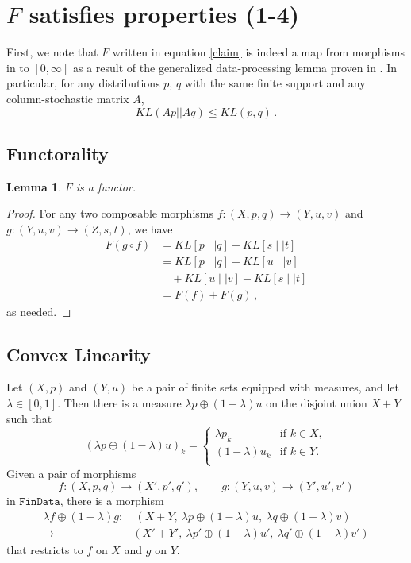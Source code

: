 \documentclass{article}
\newtheorem{lemma}{Lemma}
\begin{document}
\section{$F$ satisfies properties (1-4)}
First, we note that $F$ written in equation \eqref{claim} is indeed a map from morphisms in  to $[0, \infty]$ as a result of the generalized data-processing lemma proven in \cite{cohenRelativeEntropyMappings1993}. In particular, for any distributions $p$, $q$ with the same finite support and any column-stochastic matrix $A$, 
$$
    KL(Ap || Aq) \leq KL(p, q)\,.
$$

\subsection{Functorality}
\begin{lemma}
$F$ is a functor.
\end{lemma}

\begin{proof}
For any two composable morphisms $f:(X, p, q) \rightarrow (Y, u, v)$ and $g:(Y, u, v) \rightarrow (Z, s, t)$, we have 
\begin{align*}
  F(g \circ f) &= KL[p \mid\mid q] - KL[s \mid\mid t]\\
  &= KL[p \mid\mid q] - KL[u \mid\mid v] \\
  &\quad + KL[u \mid\mid v] - KL[s \mid\mid t] \\
  &= F(f) + F(g)\,,
\end{align*}
as needed.
\end{proof}


\subsection{Convex Linearity}
Let $(X, p)$ and $(Y, u)$ be a pair of finite sets equipped with measures, and let $\lambda \in [0,1]$. Then there is a measure $\lambda p \oplus (1-\lambda)u$ on the disjoint union $X + Y$ such that
$$
  (\lambda p \oplus (1-\lambda)u)_k = \begin{cases}
    \lambda p_k &\text{if } k\in X,\\
    (1-\lambda) u_k &\text{if } k\in Y.\\
  \end{cases}
$$
Given a pair of morphisms
$$
f:(X, p, q) \rightarrow (X', p', q'), \qquad g:(Y, u, v) \rightarrow (Y', u', v')
$$
in $\texttt{FinData}$, there is a  morphism
\begin{align*}
\lambda f \oplus (1-\lambda) g:
&\ (X + Y, \ \lambda p \oplus (1-\lambda)u, \ \lambda q \oplus (1-\lambda)v)\\ \rightarrow& (X' + Y', \ \lambda p' \oplus (1-\lambda)u', \ \lambda q' \oplus (1-\lambda)v')
\end{align*}
that restricts to $f$ on $X$ and $g$ on $Y$.
\end{document}
